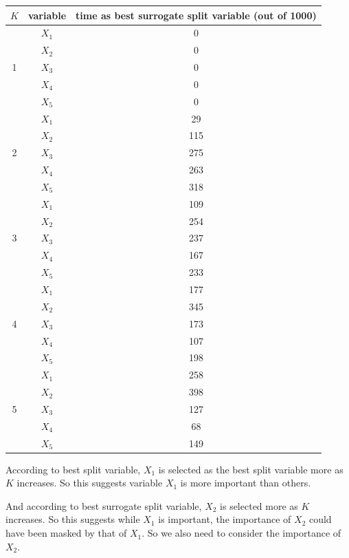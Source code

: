 \documentclass[paper=letter, fontsize=12pt]{article}
\begin{document}
\begin{enumerate}[label=(\alph*)]
\begin{enumerate}[label=(\roman*)]
		\begin{center}
			\begin{longtable}{|c|c|c|}
				\hline
				$K$ & variable & time as best surrogate split variable (out of 1000) \\ \hline
				\multirow{5}{1em}{1} & $X_1$ & 0 \\ 
				& $X_2$ & 0 \\
				& $X_3$ & 0 \\
				& $X_4$ & 0 \\
				& $X_5$ & 0 \\
				\hline
				\multirow{5}{1em}{2} & $X_1$ & 29 \\ 
				& $X_2$ & 115 \\
				& $X_3$ & 275 \\
				& $X_4$ & 263 \\
				& $X_5$ & 318 \\
				\hline
				\multirow{5}{1em}{3} & $X_1$ & 109 \\ 
				& $X_2$ & 254 \\
				& $X_3$ & 237 \\
				& $X_4$ & 167 \\
				& $X_5$ & 233 \\
				\hline
				\multirow{5}{1em}{4} & $X_1$ & 177 \\ 
				& $X_2$ & 345 \\
				& $X_3$ & 173 \\
				& $X_4$ & 107 \\
				& $X_5$ & 198 \\
				\hline
				\multirow{5}{1em}{5} & $X_1$ & 258 \\ 
				& $X_2$ & 398 \\
				& $X_3$ & 127 \\
				& $X_4$ & 68 \\
				& $X_5$ & 149 \\
				\hline
			\end{longtable}
		\end{center}
	
		According to best split variable, $X_1$ is selected as the best split variable more as $K$ increases. So this suggests variable $X_1$ is more important than others.
		
		And according to best surrogate split variable, $X_2$ is selected more as $K$ increases. So this suggests while $X_1$ is important, the importance of $X_2$ could have been masked by that of $X_1$. So we also need to consider the importance of $X_2$.
		

\end{enumerate}
\end{enumerate}
\end{document}
